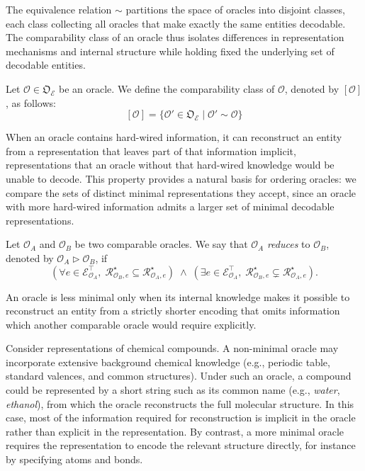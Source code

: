 The equivalence relation $\sim$ partitions the space of oracles into disjoint classes, each class collecting all oracles that make exactly the same entities decodable. The comparability class of an oracle thus isolates differences in representation mechanisms and internal structure while holding fixed the underlying set of decodable entities. 

\begin{definition}
Let $\mathcal O \in \mathfrak O_{\mathcal E}$ be an oracle. We define the comparability class of $\mathcal O$, denoted by $[\mathcal{O}]$, as follows:
\[
[\mathcal O] = \{\mathcal O'\in\mathfrak O_{\mathcal E}\mid \mathcal O'\sim \mathcal O\}
\]
\end{definition}

When an oracle contains hard-wired information, it can reconstruct an entity from a representation that leaves part of that information implicit, representations that an oracle without that hard-wired knowledge would be unable to decode. This property provides a natural basis for ordering oracles: we compare the sets of distinct minimal representations they accept, since an oracle with more hard-wired information admits a larger set of minimal decodable representations.

\begin{definition}
Let $\mathcal{O}_A$ and $\mathcal{O}_B$ be two comparable oracles. We say that $\mathcal{O}_A$ \emph{reduces} to $\mathcal{O}_B$, denoted by $\mathcal{O}_A \triangleright \mathcal{O}_B$, if
\[
\left(
\forall e \in \mathcal{E}^\top_{\mathcal{O}_A},\;
\mathcal{R}^\star_{\mathcal{O}_B, e} \subseteq \mathcal{R}^\star_{\mathcal{O}_A, e}
\right)
\;\wedge\;
\left(
\exists e \in \mathcal{E}^\top_{\mathcal{O}_A},\;
\mathcal{R}^\star_{\mathcal{O}_B, e} \subsetneq \mathcal{R}^\star_{\mathcal{O}_A, e}
\right).
\]
\end{definition}

\noindent
An oracle is less minimal only when its internal knowledge makes it possible to reconstruct an entity from a strictly shorter encoding that omits information which another comparable oracle would require explicitly.

\begin{example}
Consider representations of chemical compounds. A non-minimal oracle may incorporate extensive background chemical knowledge (e.g., periodic table, standard valences, and common structures). Under such an oracle, a compound could be represented by a short string such as its common name (e.g., \emph{water}, \emph{ethanol}), from which the oracle reconstructs the full molecular structure. In this case, most of the information required for reconstruction is implicit in the oracle rather than explicit in the representation. By contrast, a more minimal oracle requires the representation to encode the relevant structure directly, for instance by specifying atoms and bonds.
\end{example}

